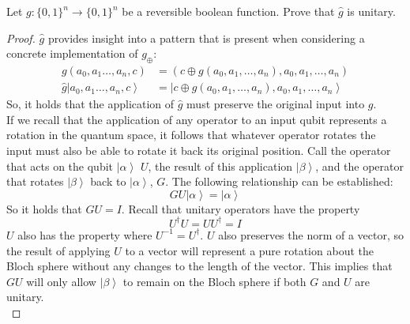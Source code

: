 \documentclass{exam} %
\theoremstyle{plain}
\theoremstyle{definition}
\theoremstyle{remark}
\numberwithin{equation}{section}  %
\renewcommand{\ket}[1]{ \left| #1 \right> }
\begin{document}
\begin{questions}
\begin{solution}
\end{solution}
\question Let $g:\{0,1\}^n\to\{0,1\}^n$ be a reversible boolean function.
Prove that $\widehat{g}$ is unitary.
\begin{solution}
  \begin{proof}
    $\widehat{g}$ provides insight into a pattern that is present when 
    considering a concrete implementation of $g_{\oplus}$:
    \begin{align*}
      g(a_0,a_1\hdots,a_n, c) &= (c\oplus g(a_0,a_1,\hdots,a_n), 
      a_0,a_1,\hdots,a_n)\\
      \widehat{g}\ket{a_0,a_1\hdots,a_n, c} &= \ket{c\oplus g(a_0,a_1,
      \hdots,a_n), 
      a_0,a_1,\hdots,a_n}
    \end{align*}
    So, it holds that the application of $\widehat{g}$ must preserve the 
    original input into $g$.\\
    
    If we recall that the application of any
    operator to an input qubit represents a rotation in the quantum space,
    it follows that whatever operator rotates the input must also be able to
    rotate it back its original position. Call the operator that acts on the
    qubit $\ket{\alpha}$ $U$, the result of this application $\ket{\beta}$,
    and the operator that rotates $\ket{\beta}$ back to $\ket{\alpha}$, $G$.
    The following relationship can be established:
    \[
      GU\ket{\alpha} = \ket{\alpha}
    \]
    So it holds that $GU = I$. Recall that unitary operators have the property
    \[
      U^{\dagger}U = UU^{\dagger} = I
    \]
    $U$ also has the property where $U^{-1} = U^\dagger$. $U$ also preserves
    the norm of a vector, so the result of applying $U$ to a vector will 
    represent a pure rotation about the Bloch sphere without any changes to
    the length of the vector. This implies that $GU$ will only allow 
    $\ket{\beta}$ to remain on the Bloch sphere if both $G$ and $U$ are 
    unitary.\\


\end{proof}
\end{solution}
\end{questions}
\end{document}
